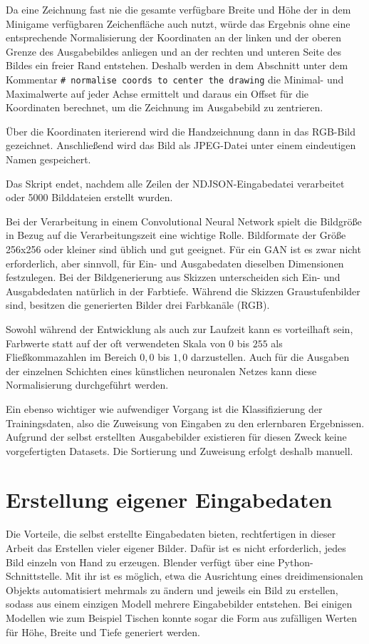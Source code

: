 Da eine Zeichnung fast nie die gesamte verfügbare Breite und Höhe der in dem Minigame verfügbaren Zeichenfläche auch nutzt, würde das Ergebnis ohne eine entsprechende Normalisierung der Koordinaten an der linken und der oberen Grenze des Ausgabebildes anliegen und an der rechten und unteren Seite des Bildes ein freier Rand entstehen. Deshalb werden in dem Abschnitt unter dem Kommentar \lstinline{# normalise coords to center the drawing} die Minimal- und Maximalwerte auf jeder Achse ermittelt und daraus ein Offset für die Koordinaten berechnet, um die Zeichnung im Ausgabebild zu zentrieren.

Über die Koordinaten iterierend wird die Handzeichnung dann in das RGB-Bild gezeichnet. Anschließend wird das Bild als JPEG-Datei unter einem eindeutigen Namen gespeichert.

Das Skript endet, nachdem alle Zeilen der NDJSON-Eingabedatei verarbeitet oder 5000 Bilddateien erstellt wurden.

Bei der Verarbeitung in einem Convolutional Neural Network spielt die Bildgröße
in Bezug auf die Verarbeitungszeit eine wichtige Rolle. Bildformate der Größe 256x256 oder kleiner sind üblich und gut geeignet. Für ein GAN ist es zwar nicht erforderlich, aber sinnvoll, für Ein- und Ausgabedaten dieselben Dimensionen festzulegen. Bei der Bildgenerierung aus Skizzen unterscheiden sich Ein- und Ausgabdedaten natürlich in der Farbtiefe. Während die Skizzen Graustufenbilder sind, besitzen die generierten Bilder drei Farbkanäle (RGB).

Sowohl während der Entwicklung als auch zur Laufzeit kann es vorteilhaft sein, Farbwerte statt auf der oft verwendeten Skala von $0$ bis $255$ als Fließkommazahlen im Bereich $0,0$ bis $1,0$ darzustellen. Auch für die Ausgaben der einzelnen Schichten eines künstlichen neuronalen Netzes kann diese Normalisierung durchgeführt werden.

Ein ebenso wichtiger wie aufwendiger Vorgang ist die Klassifizierung der Trainingsdaten, also die Zuweisung von Eingaben zu den erlernbaren Ergebnissen. Aufgrund der selbst erstellten Ausgabebilder existieren für diesen Zweck keine vorgefertigten Datasets. Die Sortierung und Zuweisung erfolgt deshalb manuell.
\pagebreak

\section{Erstellung eigener Eingabedaten}
\label{sec:inputdata}

Die Vorteile, die selbst erstellte Eingabedaten bieten, rechtfertigen in dieser Arbeit das Erstellen vieler eigener Bilder. Dafür ist es nicht erforderlich, jedes Bild einzeln von Hand zu erzeugen. Blender verfügt über eine Python-Schnittstelle. Mit ihr ist es möglich, etwa die Ausrichtung eines dreidimensionalen Objekts automatisiert mehrmals zu ändern und jeweils ein Bild zu erstellen, sodass aus einem einzigen Modell mehrere Eingabebilder entstehen. Bei einigen Modellen wie zum Beispiel Tischen konnte sogar die Form aus zufälligen Werten für Höhe, Breite und Tiefe generiert werden.


